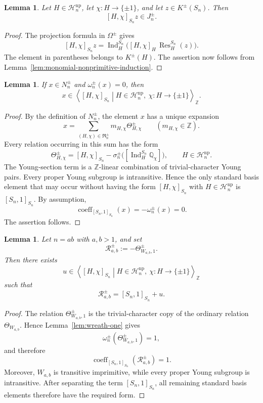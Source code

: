 \documentclass[a4paper,11pt]{article}
\numberwithin{equation}{section}
\newtheorem{lemma}[theorem]{Lemma}
\newcommand{\Q}{\mathbb{Q}}
\newcommand{\Z}{\mathbb{Z}}
\newcommand{\Ind}{\operatorname{Ind}}
\newcommand{\Res}{\operatorname{Res}}
\newcommand{\coeff}{\operatorname{coeff}}
\begin{document}
\begin{lemma}\label{lem:monomial-projection}
Let $H\in\mathcal H_n^{\mathrm{np}}$, let $\chi:H\to\{\pm1\}$, and let
$z\in K^{\pm}(S_n)$. Then
\[
  [H,\chi]_{S_n}z\in J_n^{\pm}.
\]
\end{lemma}

\begin{proof}
The projection formula in $\Omega^{\pm}$ gives
\[
  [H,\chi]_{S_n}z
  =
  \Ind_H^{S_n}
  \bigl([H,\chi]_H\,\Res_H^{S_n}(z)\bigr).
\]
The element in parentheses belongs to $K^{\pm}(H)$. The assertion now follows
from Lemma~\ref{lem:monomial-nonprimitive-induction}.
\end{proof}

\begin{lemma}\label{lem:monomial-zero-span}
If $x\in N_n^{\pm}$ and $\omega_n^{\pm}(x)=0$, then
\[
  x\in
  \left\langle
    [H,\chi]_{S_n}
    \mathrel{}\middle|\mathrel{}
    H\in\mathcal H_n^{\mathrm{np}},\
    \chi:H\to\{\pm1\}
  \right\rangle_{\Z}.
\]
\end{lemma}

\begin{proof}
By the definition of $N_n^{\pm}$, the element $x$ has a unique expansion
\[
  x
  =
  \sum_{(H,\chi)\in\mathfrak R_n^{\pm}}
  m_{H,\chi}\Theta_{H,\chi}^{\pm}
  \qquad
  (m_{H,\chi}\in\Z).
\]
Every relation occurring in this sum has the form
\[
  \Theta_{H,\chi}^{\pm}
  =
  [H,\chi]_{S_n}
  -
  \sigma_n^{\pm}\bigl([\Ind_H^{S_n}\Q_\chi]\bigr),
  \qquad
  H\in\mathcal H_n^{\mathrm{np}}.
\]
The Young-section term is a $\Z$-linear combination of trivial-character
Young pairs. Every proper Young subgroup is intransitive. Hence the only
standard basis element that may occur without having the form
$[H,\chi]_{S_n}$ with $H\in\mathcal H_n^{\mathrm{np}}$ is
$[S_n,1]_{S_n}$. By assumption,
\[
  \coeff_{[S_n,1]_{S_n}}(x)
  =
  -\omega_n^{\pm}(x)
  =
  0.
\]
The assertion follows.
\end{proof}

\begin{lemma}\label{lem:monomial-wreath-unit}
Let $n=ab$ with $a,b>1$, and set
\[
  \mathcal R_{a,b}^{\pm}
  :=
  -\Theta_{W_{a,b},1}^{\pm}.
\]
Then there exists
\[
  u\in
  \left\langle
    [H,\chi]_{S_n}
    \mathrel{}\middle|\mathrel{}
    H\in\mathcal H_n^{\mathrm{np}},\
    \chi:H\to\{\pm1\}
  \right\rangle_{\Z}
\]
such that
\[
  \mathcal R_{a,b}^{\pm}=[S_n,1]_{S_n}+u.
\]
\end{lemma}

\begin{proof}
The relation $\Theta_{W_{a,b},1}^{\pm}$ is the trivial-character copy of the
ordinary relation $\Theta_{W_{a,b}}$. Hence Lemma~\ref{lem:wreath-one} gives
\[
  \omega_n^{\pm}(\Theta_{W_{a,b},1}^{\pm})=1,
\]
and therefore
\[
  \coeff_{[S_n,1]_{S_n}}(\mathcal R_{a,b}^{\pm})=1.
\]
Moreover, $W_{a,b}$ is transitive imprimitive, while every proper Young
subgroup is intransitive. After separating the term $[S_n,1]_{S_n}$, all
remaining standard basis elements therefore have the required form.
\end{proof}
\end{document}
